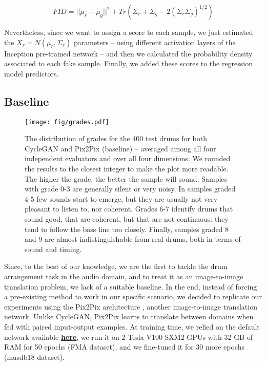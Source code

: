 \documentclass[journal]{IEEEtran}
\begin{document}
$$
FID=||\mu_r - \mu_g||^2+Tr(\Sigma_r+\Sigma_g - 2(\Sigma_r\Sigma_g)^{1/2})
$$ 

Nevertheless, since we want to assign a score to each sample, we just estimated the  $X_r = N(\mu_r,\Sigma_r)$ parameters -- using different activation layers of the Inception pre-trained network -- and then we calculated the probability density associated to each fake sample. Finally, we added these scores to the regression model predictors.

\subsection{Baseline}

\begin{figure*}[!ht]
\begin{center}
\texttt{[image: fig/grades.pdf]}
\end{center}
\caption{\centering   The distribution of grades for the 400 test drums for both CycleGAN and Pix2Pix (baseline) -- averaged among all four independent evaluators and over all four dimensions. We rounded the results to the closest integer to make the plot more readable. The higher the grade, the better the sample will sound. Samples with grade 0-3 are generally silent or very noisy. In samples graded 4-5 few sounds start to emerge, but they are usually not very pleasant to listen to, nor coherent. Grades 6-7 identify drums that sound good, that are coherent, but that are not continuous: they tend to follow the bass line too closely. Finally, samples graded 8 and 9 are almost indistinguishable from real drums, both in terms of sound and timing.}
\label{fig:grade_dist}
\end{figure*}

Since, to the best of our knowledge, we are the first to tackle the drum arrangement task in the audio domain, and to treat it as an image-to-image translation problem, we %
lack of a suitable baseline. In the end, instead of forcing a pre-existing method to work in our specific scenario, we decided to replicate our experiments using the Pix2Pix architecture \cite{isola2017image}, another image-to-image translation network. Unlike CycleGAN, Pix2Pix learns to translate between domains when fed with paired input-output examples. At training time, we relied on the default network available \underline{\textbf{\href{https://github.com/junyanz/pytorch-CycleGAN-and-pix2pix}{here}}}, we run it on 2 Tesla V100 SXM2 GPUs with 32 GB of RAM for 50 epochs (FMA dataset), and we fine-tuned it for 30 more epochs (musdb18 dataset). 
\end{document}
